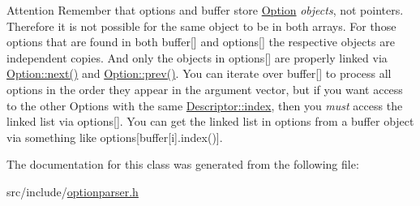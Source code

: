 \begin{DoxyAttention}{Attention}
Remember that {\ttfamily options} and {\ttfamily buffer} store \hyperlink{classxmem_1_1config_1_1third__party_1_1_option}{Option} {\itshape objects}, not pointers. Therefore it is not possible for the same object to be in both arrays. For those options that are found in both {\ttfamily buffer}\mbox{[}\mbox{]} and {\ttfamily options}\mbox{[}\mbox{]} the respective objects are independent copies. And only the objects in {\ttfamily options}\mbox{[}\mbox{]} are properly linked via \hyperlink{classxmem_1_1config_1_1third__party_1_1_option_af9c5d2de03863bbcdc05a1d6771f1f36}{Option\-::next()} and \hyperlink{classxmem_1_1config_1_1third__party_1_1_option_a51c55046e8f111be3e329f798d0f72b9}{Option\-::prev()}. You can iterate over {\ttfamily buffer}\mbox{[}\mbox{]} to process all options in the order they appear in the argument vector, but if you want access to the other Options with the same \hyperlink{structxmem_1_1config_1_1third__party_1_1_descriptor_aacf3d44f35c61f22be65da078f60734b}{Descriptor\-::index}, then you {\itshape must} access the linked list via {\ttfamily options}\mbox{[}\mbox{]}. You can get the linked list in options from a buffer object via something like {\ttfamily options}\mbox{[}buffer\mbox{[}i\mbox{]}.index()\mbox{]}. 
\end{DoxyAttention}


The documentation for this class was generated from the following file\-:\begin{DoxyCompactItemize}
\item 
src/include/\hyperlink{optionparser_8h}{optionparser.\-h}\end{DoxyCompactItemize}
